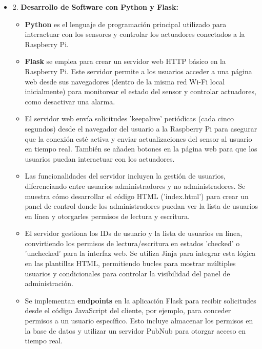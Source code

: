 \documentclass{report}
\begin{document}
\begin{itemize}
\item 2. \textbf{Desarrollo de Software con Python y Flask:}
\begin{itemize}
    \item \textbf{Python} es el lenguaje de programación principal utilizado para interactuar con los sensores y controlar 
    los actuadores conectados a la Raspberry Pi.
    \item \textbf{Flask} se emplea para crear un servidor web HTTP básico en la Raspberry Pi. Este servidor permite a los 
    usuarios acceder a una página web desde sus navegadores (dentro de la misma red Wi-Fi local inicialmente) para monitorear 
    el estado del sensor y controlar actuadores, como desactivar una alarma.
    \item El servidor web envía solicitudes 'keepalive' periódicas (cada cinco segundos) desde el navegador del usuario a la 
    Raspberry Pi para asegurar que la conexión esté activa y enviar actualizaciones del sensor al usuario en tiempo real. También 
    se añaden botones en la página web para que los usuarios puedan interactuar con los actuadores.
    \item Las funcionalidades del servidor incluyen la gestión de usuarios, diferenciando entre usuarios administradores y no 
    administradores. Se muestra cómo desarrollar el código HTML ('index.html') para crear un panel de control donde los administradores 
    puedan ver la lista de usuarios en línea y otorgarles permisos de lectura y escritura.
    \item El servidor gestiona los IDs de usuario y la lista de usuarios en línea, convirtiendo los permisos de lectura/escritura 
    en estados 'checked' o 'unchecked' para la interfaz web. Se utiliza Jinja para integrar esta lógica en las plantillas HTML, 
    permitiendo bucles para mostrar múltiples usuarios y condicionales para controlar la visibilidad del panel de administración.
    \item Se implementan \textbf{endpoints} en la aplicación Flask para recibir solicitudes desde el código JavaScript del cliente, 
    por ejemplo, para conceder permisos a un usuario específico. Esto incluye almacenar los permisos en la base de datos y utilizar 
    un servidor PubNub para otorgar acceso en tiempo real.
\end{itemize}


\end{itemize}
\end{document}
